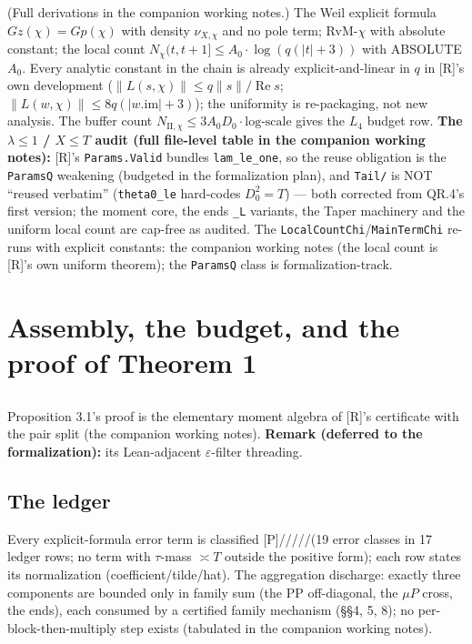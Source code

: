 \documentclass[11pt]{amsart}
\newcommand{\re}{\operatorname{Re}}
\theoremstyle{plain}
\theoremstyle{remark}
\begin{document}
(Full derivations in the companion working notes.) The Weil explicit formula
$Gz(\chi) = Gp(\chi)$ with density $\nu_{X,\chi}$ and no pole term; RvM-$\chi$ with
absolute constant; the local count $N_\chi(t, t+1] \le A_0\cdot\log(q(|t|+3))$ with
ABSOLUTE $A_0$. Every analytic constant in the chain is already explicit-and-linear
in $q$ in [R]'s own development ($\lVert L(s,\chi)\rVert \le q\lVert s\rVert/\re s$;
$\lVert L(w,\chi)\rVert \le 8q(|w.\mathrm{im}|+3)$); the uniformity is re-packaging,
not new analysis. The buffer count
$N_{\mathrm{II},\chi} \le 3A_0D_0\cdot\text{log-scale}$ gives the $L_4$ budget row.
\textbf{The $\lambda \le 1$ / $X \le T$ audit (full file-level table in the companion
working notes):} [R]'s \texttt{Params.Valid} bundles \texttt{lam\_le\_one}, so the
reuse obligation is the \texttt{ParamsQ} weakening (budgeted in the formalization
plan), and \texttt{Tail/} is NOT ``reused verbatim'' (\texttt{theta0\_le} hard-codes
$D_0^2 = T$) --- both corrected from QR.4's first version; the moment core, the ends
\texttt{\_L} variants, the Taper machinery and the uniform local count are cap-free
as audited. The \texttt{LocalCountChi}/\texttt{MainTermChi} re-runs with explicit
constants: the companion working notes (the local count is [R]'s own uniform
theorem); the \texttt{ParamsQ} class is formalization-track.

\section{Assembly, the budget, and the proof of Theorem 1}

\subsection{}
Proposition 3.1's proof is the elementary moment algebra of [R]'s certificate with
the pair split (the companion working notes). \textbf{Remark (deferred to the
formalization):} its Lean-adjacent $\varepsilon$-filter threading.

\subsection{The ledger}
Every explicit-formula error term is classified
[P]/\allowbreak[R]/\allowbreak[CS]/\allowbreak[LS]/\allowbreak[X]/\allowbreak[M]
(19 error
classes in 17 ledger rows; no term with $\tau$-mass $\asymp T$ outside the positive
form); each row states its normalization (coefficient/tilde/hat). The aggregation
discharge: exactly three components are bounded only in family sum (the PP
off-diagonal, the $\mu P$ cross, the ends), each consumed by a certified family
mechanism (\S\S4, 5, 8); no per-block-then-multiply step exists (tabulated in the
companion working notes).
\end{document}
